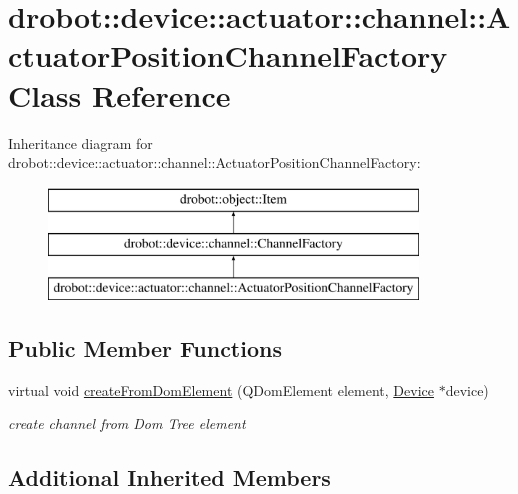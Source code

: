 \hypertarget{classdrobot_1_1device_1_1actuator_1_1channel_1_1ActuatorPositionChannelFactory}{\section{drobot\-:\-:device\-:\-:actuator\-:\-:channel\-:\-:Actuator\-Position\-Channel\-Factory Class Reference}
\label{classdrobot_1_1device_1_1actuator_1_1channel_1_1ActuatorPositionChannelFactory}
}
Inheritance diagram for drobot\-:\-:device\-:\-:actuator\-:\-:channel\-:\-:Actuator\-Position\-Channel\-Factory\-:\begin{figure}[H]
\begin{center}
\leavevmode
\includegraphics[height=3.000000cm]{classdrobot_1_1device_1_1actuator_1_1channel_1_1ActuatorPositionChannelFactory}
\end{center}
\end{figure}
\subsection*{Public Member Functions}
\begin{DoxyCompactItemize}
\item 
virtual void \hyperlink{classdrobot_1_1device_1_1actuator_1_1channel_1_1ActuatorPositionChannelFactory_a66d52953c14b0686b3dd61b9f8462476}{create\-From\-Dom\-Element} (Q\-Dom\-Element element, \hyperlink{classdrobot_1_1device_1_1Device}{Device} $\ast$device)
\begin{DoxyCompactList}\small\item\em create channel from Dom Tree element \end{DoxyCompactList}\end{DoxyCompactItemize}
\subsection*{Additional Inherited Members}



